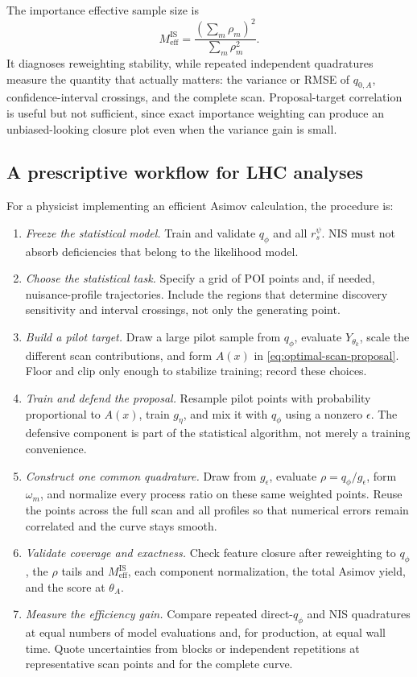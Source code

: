 \documentclass[
  aps,
  prd,
  superscriptaddress,
  nofootinbib,
  longbibliography,
  12pt
]{revtex4-2}
\newcommand{\qRef}{q_{\phi}}
\begin{document}
The importance effective sample size is
\begin{equation}
  M_{\mathrm{eff}}^{\mathrm{IS}}
  =\frac{(\sum_m\rho_m)^2}{\sum_m\rho_m^2}.
  \label{eq:nis-ess}
\end{equation}
It diagnoses reweighting stability, while repeated independent quadratures measure the quantity that actually matters: the variance or RMSE of $q_{0,A}$, confidence-interval crossings, and the complete scan.  Proposal-target correlation is useful but not sufficient, since exact importance weighting can produce an unbiased-looking closure plot even when the variance gain is small.

\subsection{A prescriptive workflow for LHC analyses}
\label{sec:nis-recipe}

For a physicist implementing an efficient Asimov calculation, the procedure is:
\begin{enumerate}
  \item \emph{Freeze the statistical model.}  Train and validate $\qRef$ and all $r_s^\psi$.  NIS must not absorb deficiencies that belong to the likelihood model.
  \item \emph{Choose the statistical task.}  Specify a grid of POI points and, if needed, nuisance-profile trajectories.  Include the regions that determine discovery sensitivity and interval crossings, not only the generating point.
  \item \emph{Build a pilot target.}  Draw a large pilot sample from $\qRef$, evaluate $Y_{\theta_k}$, scale the different scan contributions, and form $A(x)$ in \cref{eq:optimal-scan-proposal}.  Floor and clip only enough to stabilize training; record these choices.
  \item \emph{Train and defend the proposal.}  Resample pilot points with probability proportional to $A(x)$, train $g_\eta$, and mix it with $\qRef$ using a nonzero $\epsilon$.  The defensive component is part of the statistical algorithm, not merely a training convenience.
  \item \emph{Construct one common quadrature.}  Draw from $g_\epsilon$, evaluate $\rho=q_\phi/g_\epsilon$, form $\omega_m$, and normalize every process ratio on these same weighted points.  Reuse the points across the full scan and all profiles so that numerical errors remain correlated and the curve stays smooth.
  \item \emph{Validate coverage and exactness.}  Check feature closure after reweighting to $\qRef$, the $\rho$ tails and $M_{\mathrm{eff}}^{\mathrm{IS}}$, each component normalization, the total Asimov yield, and the score at $\theta_A$.
  \item \emph{Measure the efficiency gain.}  Compare repeated direct-$\qRef$ and NIS quadratures at equal numbers of model evaluations and, for production, at equal wall time.  Quote uncertainties from blocks or independent repetitions at representative scan points and for the complete curve.
\end{enumerate}
\end{document}
